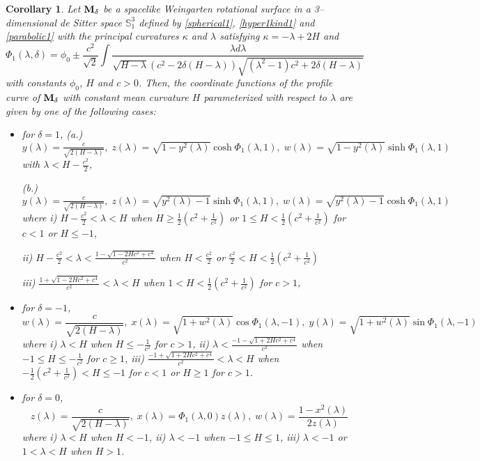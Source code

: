 \documentclass{amsart}
\newtheorem{Corollary}[Theorem]{Corollary}
\theoremstyle{definition}
\numberwithin{equation}{section}
\begin{document}
\begin{Corollary}
\label{spacelikeWeingarten}
Let ${\bf M}_\delta$ be a spacelike Weingarten rotational surface in a 3--dimensional de Sitter space $\mathbb{S}^3_1$
defined by \eqref{spherical1}, \eqref{hyper1kind1} and \eqref{parabolic1} 
with the principal curvatures $\kappa$ and $\lambda$ satisfying $\kappa=-\lambda+2H$ and 
 \begin{equation}
        \Phi_1(\lambda,\delta)=
        \phi_0\pm\frac{c^2}{\sqrt{2}}\int{\frac{\lambda d\lambda}{\sqrt{H-\lambda}(c^2-2\delta(H-\lambda))\sqrt{(\lambda^2-1)c^2+2\delta(H-\lambda)}}}
    \end{equation}
with constants $\phi_0$, $H$ and $c>0$. 
Then, the coordinate functions of the profile curve of ${\bf M}_\delta$ with constant mean curvature $H$ parameterized with respect to $\lambda$
are given by one of the following cases:
\begin{itemize}
    \item [1.] for $\delta=1$, 
    \subitem (a.) $y(\lambda)=\frac{c}{\sqrt{2(H-\lambda)}},\; z(\lambda)=\sqrt{1-y^2(\lambda)}\cosh{\Phi_1(\lambda,1)},\; w(\lambda)=\sqrt{1-y^2(\lambda)}
    \sinh{\Phi_1(\lambda,1)}$
    with $\lambda<H-\frac{c^2}{2}$,
   
    \subitem (b.) $y(\lambda)=\frac{c}{\sqrt{2(H-\lambda)}},\; z(\lambda)=\sqrt{y^2(\lambda)-1}\sinh{\Phi_1(\lambda,1)},\; w(\lambda)=\sqrt{y^2(\lambda)-1}
    \cosh{\Phi_1(\lambda,1)}$
    where
    \subsubitem i)
    $H-\frac{c^2}{2}<\lambda< H$ when $H\geq\frac{1}{2}\left(c^2+\frac{1}{c^2}\right)$ or 
    $1\leq H<\frac{1}{2}\left(c^2+\frac{1}{c^2}\right)$ for $c<1$
    or $H\leq  -1$,
    
    \subsubitem ii)
    $H-\frac{c^2}{2}<\lambda
    <\frac{1-\sqrt{1-2Hc^2+c^4}}{c^2}$ when $H<\frac{c^2}{2}$ or $\frac{c^2}{2}<H
    <\frac{1}{2}\left(c^2+\frac{1}{c^2}\right)$
    
    \subsubitem iii) $\frac{1+\sqrt{1-2Hc^2+c^4}}{c^2}<\lambda<H$ when $1<H<\frac{1}{2}\left(c^2+\frac{1}{c^2}\right)$ for $c>1$,
    
    \item [2.] for $\delta=-1$, 
    $$w(\lambda)=\frac{c}{\sqrt{2(H-\lambda)}},\; x(\lambda)=\sqrt{1+w^2(\lambda)}\cos{\Phi_1(\lambda,-1)},
    \; 
    y(\lambda)=\sqrt{1+w^2(\lambda)}\sin{\Phi_1(\lambda,-1)}$$
    where 
    \subitem i) $\lambda<H$ when $H\leq-\frac{1}{c^2}$ for $c>1$,
    \subitem ii) $\displaystyle{\lambda<\frac{-1-\sqrt{1+2Hc^2+c^4}}{c^2}}$ when
    $-1\leq H\leq-\frac{1}{c^2}$ for $c\geq 1$,
    \subitem iii) 
    $\displaystyle{\frac{-1+\sqrt{1+2Hc^2+c^4}}{c^2}}
    <\lambda<H$ when
    $-\frac{1}{2}\left(c^2+\frac{1}{c^2}\right)<H\leq -1$ for $c<1$ or
    $H\geq 1$ for $c>1$.

    
    \item [3.] for $\delta=0$,
    $$z(\lambda)=\frac{c}{\sqrt{2(H-\lambda)}},\; x(\lambda)=\Phi_1(\lambda,0)z(\lambda),\; w(\lambda)=\frac{1-x^2(\lambda)}{2z(\lambda)}$$
    where 
    \subitem i) $\lambda<H$ when $H<-1$,
    \subitem ii) $\lambda<-1$ when $-1\leq H \leq 1$,
    \subitem iii) $\lambda<-1$ or $1<\lambda<H$ when $H>1$. 
\end{itemize}
\end{Corollary}
\end{document}
